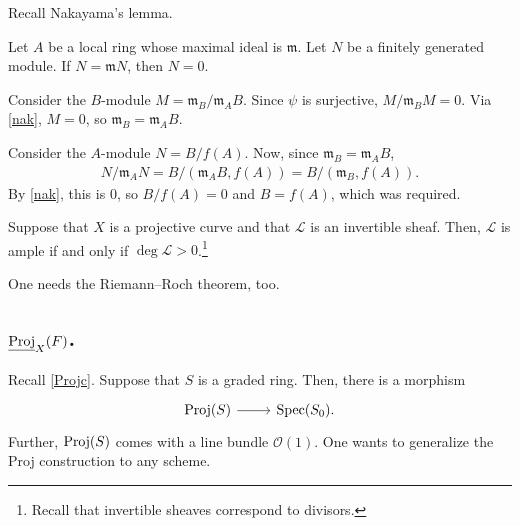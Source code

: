 \documentclass [11 pt, oneside] {article}
\begin{document}
Recall Nakayama's lemma.

\begin{lemma}[Nakayama]\label{nak}\text{}
Let $A$ be a local ring whose maximal ideal is $\mathfrak{m}$. Let $N$ be a finitely generated module. If $N = \mathfrak{m}N$, then $N=0$.
\end{lemma}

Consider the $B$-module $M=\mathfrak{m}_B/\mathfrak{m}_A B$. Since $\psi$ is surjective, $M/\mathfrak{m}_BM = 0$. Via \cref{nak}, $M=0$, so $\mathfrak{m}_B = \mathfrak{m}_AB$.

Consider the $A$-module $N = B/f(A)$. Now, since $\mathfrak{m}_B = \mathfrak{m}_AB$,
\begin{align*}
	N/\mathfrak{m}_AN = B/(\mathfrak{m}_AB, f(A)) = B/(\mathfrak{m}_B,f(A)).
\end{align*}
By \cref{nak}, this is $0$, so $B/f(A)=0$ and $B=f(A)$, which was required.

\begin{corollary}[ ]\label{}\text{}
Suppose that $X$ is a projective curve and that $\mathscr{L}$ is an invertible sheaf. Then, $\mathscr{L}$ is ample if and only if $\deg \mathscr{L}>0$.\footnote{Recall that invertible sheaves correspond to divisors.}
\end{corollary}

One needs the Riemann--Roch theorem, too.

\subsection{\texorpdfstring{$\underline{\operatorname{Proj}}_X(\relax{F})$}{Proj X (F)}.}
Recall \cref{Projc}. Suppose that $S$ is a graded ring. Then, there is a morphism
\[
\begin{tikzcd}
	\Proj(S)\ar[r]& \Spec (S_0).
\end{tikzcd}
\]
Further, $\operatorname{Proj}(S)$ comes with a line bundle $\mathscr{O}(1)$.
One wants to generalize the Proj construction to any scheme.
\end{document}
